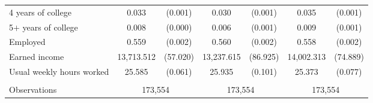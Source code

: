 \begin{tabular}{lcccccc}
 \hspace{0.3cm} 4 years of college   & 0.033 & (0.001)  & 0.030 & (0.001)  & 0.035 & (0.001)  \\
 \hspace{0.3cm} 5$+$ years of college   & 0.008 & (0.000)  & 0.006 & (0.001)  & 0.009 & (0.001)  \\
 Employed   & 0.559 & (0.002)  & 0.560 & (0.002)  & 0.558 & (0.002)  \\
 Earned income   & 13,713.512 & (57.020)  & 13,237.615 & (86.925)  & 14,002.313 & (74.889)  \\
 Usual weekly hours worked   & 25.585 & (0.061)  & 25.935 & (0.101)  & 25.373 & (0.077)  \\
\\
Observations & \multicolumn{2}{c}{173,554} & \multicolumn{2}{c}{173,554} & \multicolumn{2}{c}{173,554} \\
\bottomrule
\bottomrule
\end{tabular}
